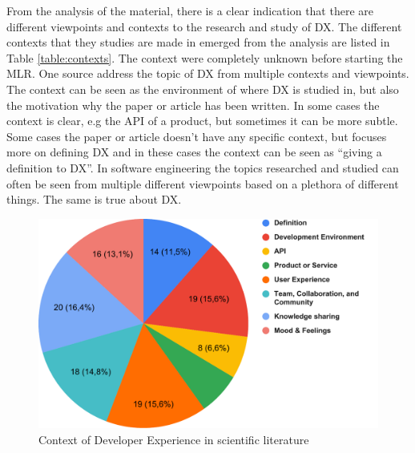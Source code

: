 \documentclass[english, 12pt, a4paper, sci, utf8, a-1b, online]{aaltothesis}
\begin{document}
From the analysis of the material, there is a clear indication that there are different viewpoints and contexts to the research and study of DX. The different contexts that they studies are made in emerged from the analysis are listed in Table \ref{table:contexts}. The context were completely unknown before starting the MLR. One source address the topic of DX from multiple contexts and viewpoints. The context can be seen as the environment of where DX is studied in, but also the motivation why the paper or article has been written. In some cases the context is clear, e.g the API of a product, but sometimes it can be more subtle. Some cases the paper or article doesn't have any specific context, but focuses more on defining DX and in these cases the context can be seen as ``giving a definition to DX''. In software engineering the topics researched and studied can often be seen from multiple different viewpoints based on a plethora of different things. The same is true about DX.

\begin{figure}[h]
  \begin{center}
    \includegraphics[width=\textwidth]{context-scientific.pdf}
    \captionsetup{width=0.6\textwidth}
    \caption{Context of Developer Experience in scientific literature}
  \end{center}
\end{figure}
\end{document}
